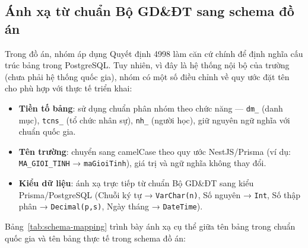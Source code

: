 \subsection{Ánh xạ từ chuẩn Bộ GD\&ĐT sang schema đồ án}

Trong đồ án, nhóm áp dụng Quyết định 4998 làm căn cứ chính để định nghĩa cấu trúc bảng trong PostgreSQL. Tuy nhiên, vì đây là hệ thống nội bộ của trường (chưa phải hệ thống quốc gia), nhóm có một số điều chỉnh về quy ước đặt tên cho phù hợp với thực tế triển khai:

\begin{itemize}
    \item \textbf{Tiền tố bảng}: sử dụng chuẩn phân nhóm theo chức năng — \texttt{dm\_} (danh mục), \texttt{tcns\_} (tổ chức nhân sự), \texttt{nh\_} (người học), giữ nguyên ngữ nghĩa với chuẩn quốc gia.
    \item \textbf{Tên trường}: chuyển sang camelCase theo quy ước NestJS/Prisma (ví dụ: \texttt{MA\_GIOI\_TINH} → \texttt{maGioiTinh}), giá trị và ngữ nghĩa không thay đổi.
    \item \textbf{Kiểu dữ liệu}: ánh xạ trực tiếp từ chuẩn Bộ GD\&ĐT sang kiểu Prisma/PostgreSQL (Chuỗi ký tự → \texttt{VarChar(n)}, Số nguyên → \texttt{Int}, Số thập phân → \texttt{Decimal(p,s)}, Ngày tháng → \texttt{DateTime}).
\end{itemize}

Bảng~\ref{tab:schema-mapping} trình bày ánh xạ cụ thể giữa tên bảng trong chuẩn quốc gia và tên bảng thực tế trong schema đồ án:


